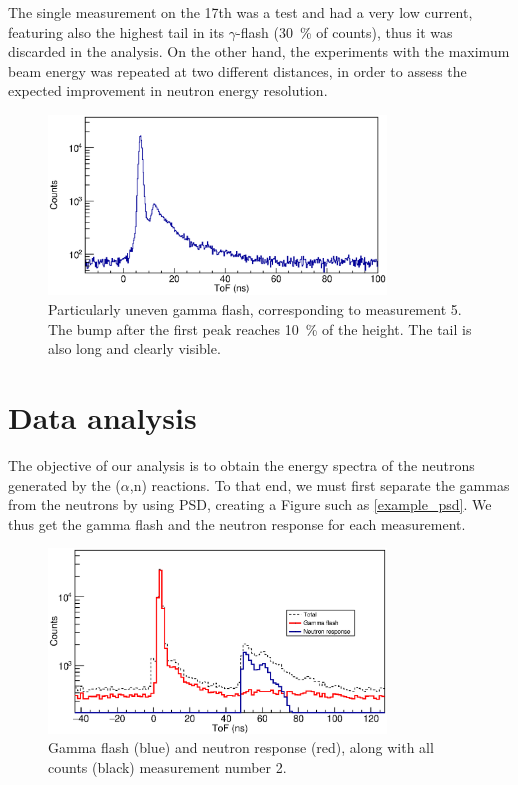 \documentclass[a4paper,12pt]{report}
\newcommand{\an}{($\alpha$,n) }
\begin{document}
The single measurement on the 17th was a test and had a very low current, featuring also the highest tail in its $\gamma$-flash (\qty{30}{\percent} of counts), thus it was discarded in the analysis.
On the other hand, the experiments with the maximum beam energy was repeated at two different distances, in order to assess the expected improvement in neutron energy resolution.

\begin{figure}[H]
	\centering
	\includegraphics[width=0.80\textwidth]{uneven_gflash.eps}
	\caption{Particularly uneven gamma flash, corresponding to measurement 5.
	The bump after the first peak reaches \qty{10}{\percent} of the height.
	The tail is also long and clearly visible.}
	\label{uneven_gflash}
\end{figure}

\section{Data analysis}
The objective of our analysis is to obtain the energy spectra of the neutrons generated by the \an reactions.
To that end, we must first separate the gammas from the neutrons by using PSD, creating a Figure such as \ref{example_psd}.
We thus get the gamma flash and the neutron response for each measurement.

\begin{figure}[H]
	\centering
	\includegraphics[width=0.80\textwidth]{separated_tof.eps}
	\caption{Gamma flash (blue) and neutron response (red), along with all counts (black) measurement number 2.}
	\label{separated_tof}
\end{figure}
\end{document}
